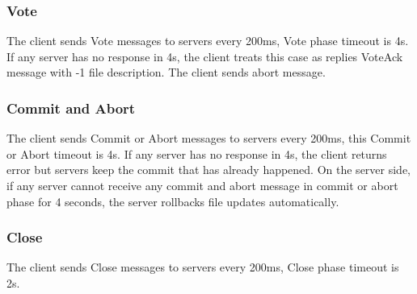 \documentclass[12pt,fleqn]{article}
\begin{document}
\subsubsection{Vote}
The client sends Vote messages to servers every 200ms, Vote phase timeout is 4s. If any server has no response in 4s, the client treats this case as replies VoteAck message with -1 file description. The client sends abort message.

\subsubsection{Commit and Abort}
The client sends Commit or Abort messages to servers every 200ms, this Commit or Abort timeout is 4s. If any server has no response in 4s, the client returns error but servers keep the commit that has already happened. On the server side, if any server cannot receive any commit and abort message in commit or abort phase for 4 seconds, the server rollbacks file updates automatically.
 
 \subsubsection{Close}
The client sends Close messages to servers every 200ms, Close phase timeout is 2s. 
 
\end{document}
